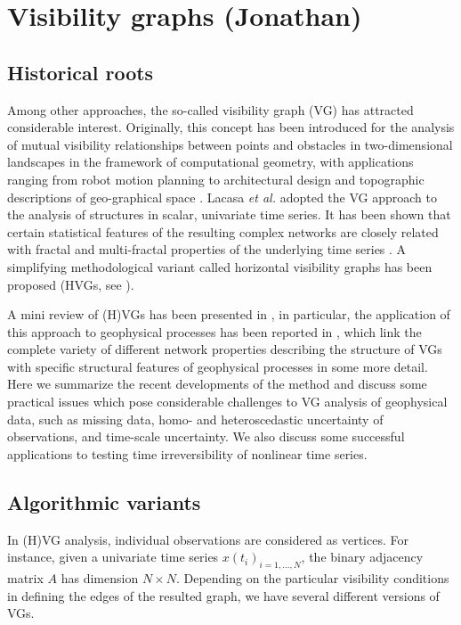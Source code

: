\section{Visibility graphs {\bf{(Jonathan)}}}\label{sec:VisibilityGt}
	\subsection{Historical roots}
	
	Among other approaches, the so-called visibility graph (VG) has attracted considerable interest. Originally, this concept has been introduced for the analysis of mutual visibility relationships between points and obstacles in two-dimensional landscapes in the framework of computational geometry, with applications ranging from robot motion planning to architectural design and topographic descriptions of geo-graphical space \cite{Lozano1979,Nagy1994,Floriani1994,Turner2001}.  Lacasa \emph{et al.}\cite{Lacasa2008} adopted the VG approach to the analysis of structures in scalar, univariate time series. It has been shown that certain statistical features of the resulting complex networks are closely related with fractal and multi-fractal properties of the underlying time series \cite{Lacasa2009,Ni2009}. A simplifying methodological variant called horizontal visibility graphs has been proposed (HVGs, see \cite{Luque2009,Lacasa2010,Xie2011,Gutin2011}). 

	A mini review of (H)VGs has been presented in \cite{Nunez2012,Luque2016}, in particular, the application of this approach to geophysical processes has been reported in \cite{Donner2012}, which link the complete variety of different network properties describing the structure of VGs with specific structural features of geophysical processes in some more detail. Here we summarize the recent developments of the method and discuss some practical issues which pose considerable challenges to VG analysis of geophysical data, such as missing data, homo- and heteroscedastic uncertainty of observations, and time-scale uncertainty. We also discuss some successful applications to testing time irreversibility of nonlinear time series. 
	
	\subsection{Algorithmic variants}
	In (H)VG analysis, individual observations are considered as vertices. For instance, given a univariate time series $x(t_i)_{i= 1, \ldots,N}$, the binary adjacency matrix $A$ has dimension ${N \times N}$. Depending on the particular visibility conditions in defining the edges of the resulted graph, we have several different versions of VGs. 
